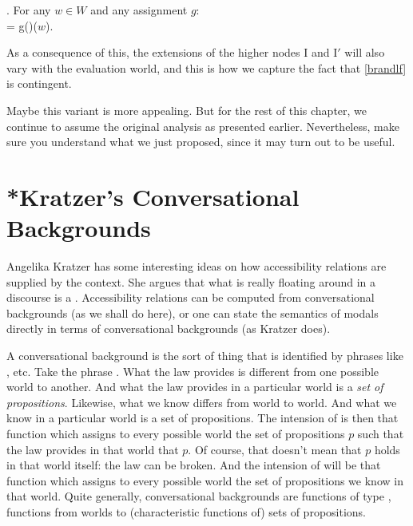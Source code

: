 \ex. For any $w\in W$ and any assignment $g$: \\
 = g()($w$).

As a consequence of this, the extensions of the higher nodes I and
I$'$ will also vary with the evaluation world, and this is how we
capture the fact that \ref{brandlf} is contingent.

Maybe this variant is more appealing. But for the rest of this
chapter, we continue to assume the original analysis as presented
earlier. %
Nevertheless, make sure you understand what we just proposed, since it may turn
out to be useful.

\section{*Kratzer's Conversational Backgrounds} \label{sec:kratz-conv-backgr}

Angelika Kratzer has some interesting ideas on how accessibility
relations are supplied by the context. She argues that what is really
floating around in a discourse is a .
Accessibility relations can be computed from conversational
backgrounds (as we shall do here), or one can state the semantics of
modals directly in terms of conversational backgrounds (as Kratzer
does).

A conversational background is the sort of thing that is identified by
phrases like , etc.
Take the phrase . What the law
provides is different from one possible world to another. And what the
law provides in a particular world is a \emph{set of propositions}.
Likewise, what we know differs from world to world. And what we know
in a particular world is a set of propositions. The intension of
 is then that function which assigns
to every possible world the set of propositions $p$ such that the law
provides in that world that $p$. Of course, that doesn't mean that $p$
holds in that world itself: the law can be broken. And the intension
of  will be that function which assigns to
every possible world the set of propositions we know in that world.
Quite generally, conversational backgrounds are functions of type
, functions from worlds to (characteristic
functions of) sets of propositions.

